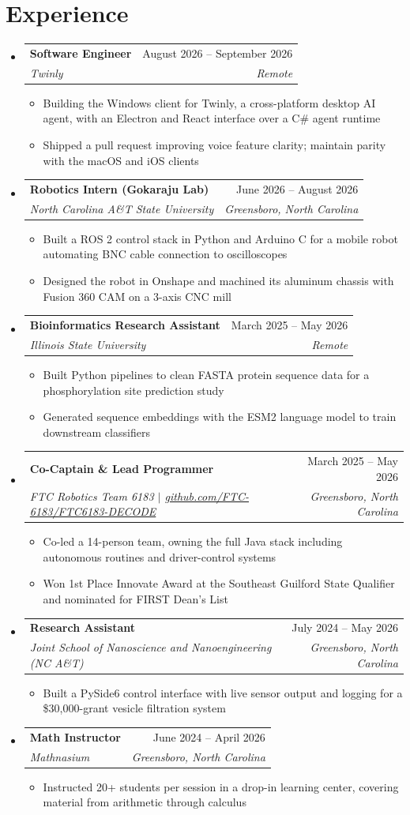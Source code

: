 \documentclass[letterpaper,11pt]{article}
\makeatletter
\newcommand{\resumeItem}[1]{
  \item\small{
    {#1 \vspace{-2pt}}
  }
}
\newcommand{\resumeSubheading}[4]{
  \vspace{-2pt}\item
    \begin{tabular*}{0.97\textwidth}[t]{l@{\extracolsep{\fill}}r}
      \textbf{#1} & #2 \\
      \textit{\small#3} & \textit{\small #4} \\
    \end{tabular*}\vspace{-7pt}
}
\newcommand{\resumeSubHeadingListStart}{\begin{itemize}[leftmargin=0.15in, label={}]}
\newcommand{\resumeSubHeadingListEnd}{\end{itemize}}
\newcommand{\resumeItemListStart}{\begin{itemize}[topsep=0pt, parsep=0pt, partopsep=0pt, itemsep=0pt, leftmargin=*]}
\newcommand{\resumeItemListEnd}{\end{itemize}\vspace{-3pt}}
\makeatother
\begin{document}
\section{Experience}
  \resumeSubHeadingListStart
    \resumeSubheading
      {Software Engineer}{August 2026 -- September 2026}
      {Twinly}{Remote}
      \resumeItemListStart
        \resumeItem{Building the Windows client for Twinly, a cross-platform desktop AI agent, with an Electron and React interface over a C\# agent runtime}
        \resumeItem{Shipped a pull request improving voice feature clarity; maintain parity with the macOS and iOS clients}
      \resumeItemListEnd
    \resumeSubheading
      {Robotics Intern (Gokaraju Lab)}{June 2026 -- August 2026}
      {North Carolina A\&T State University}{Greensboro, North Carolina}
      \resumeItemListStart
        \resumeItem{Built a ROS 2 control stack in Python and Arduino C for a mobile robot automating BNC cable connection to oscilloscopes}
        \resumeItem{Designed the robot in Onshape and machined its aluminum chassis with Fusion 360 CAM on a 3-axis CNC mill}
      \resumeItemListEnd
    \resumeSubheading
      {Bioinformatics Research Assistant}{March 2025 -- May 2026}
      {Illinois State University}{Remote}
      \resumeItemListStart
        \resumeItem{Built Python pipelines to clean FASTA protein sequence data for a phosphorylation site prediction study}
        \resumeItem{Generated sequence embeddings with the ESM2 language model to train downstream classifiers}
      \resumeItemListEnd
    \resumeSubheading
      {Co-Captain \& Lead Programmer}{March 2025 -- May 2026}
      {FTC Robotics Team 6183 $|$ \href{https://github.com/FTC-6183/FTC6183-DECODE}{github.com/FTC-6183/FTC6183-DECODE}}{Greensboro, North Carolina}
      \resumeItemListStart
        \resumeItem{Co-led a 14-person team, owning the full Java stack including autonomous routines and driver-control systems}
        \resumeItem{Won 1st Place Innovate Award at the Southeast Guilford State Qualifier and nominated for FIRST Dean's List}
      \resumeItemListEnd
    \resumeSubheading
      {Research Assistant}{July 2024 -- May 2026}
      {Joint School of Nanoscience and Nanoengineering (NC A\&T)}{Greensboro, North Carolina}
      \resumeItemListStart
        \resumeItem{Built a PySide6 control interface with live sensor output and logging for a \$30,000-grant vesicle filtration system}
      \resumeItemListEnd
    \resumeSubheading
      {Math Instructor}{June 2024 -- April 2026}
      {Mathnasium}{Greensboro, North Carolina}
      \resumeItemListStart
        \resumeItem{Instructed 20+ students per session in a drop-in learning center, covering material from arithmetic through calculus}
      \resumeItemListEnd
  \resumeSubHeadingListEnd
\end{document}
